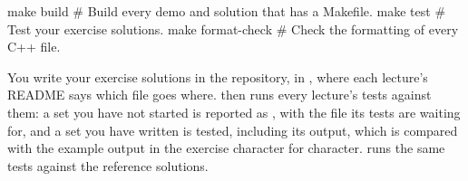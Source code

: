 \begin{shell}
make build               # Build every demo and solution that has a Makefile.
make test                # Test your exercise solutions.
make format-check        # Check the formatting of every C++ file.
\end{shell}

\noindent You write your exercise solutions in the repository, in ,
where each lecture's README says which file goes where.  then runs every
lecture's tests against them: a set you have not started is reported as , with the file
its tests are waiting for, and a set you have written is tested, including its output, which is
compared with the example output in the exercise character for character.  runs the same tests against the reference solutions.
